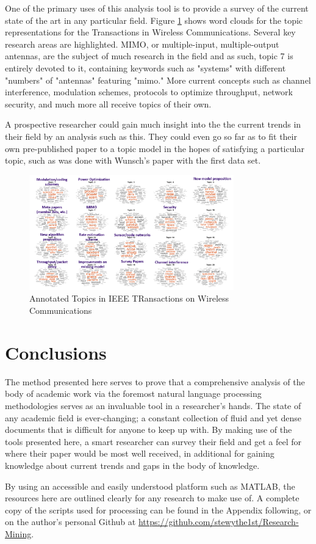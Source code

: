 \documentclass[conference]{IEEEtran}
\begin{document}
One of the primary uses of this analysis tool is to provide a survey of the current state of the art in any particular field. Figure \ref{fig:wirelesscomm_topics} shows word clouds for the topic representations for the Transactions in Wireless Communications. Several key research areas are highlighted. MIMO, or multiple-input, multiple-output antennas, are the subject of much research in the field and as such, topic 7 is entirely devoted to it, containing keywords such as "systems" with different "numbers" of "antennas" featuring "mimo." More current concepts such as channel interference, modulation schemes, protocols to optimize throughput, network security, and much more all receive topics of their own.

A prospective researcher could gain much insight into the the current trends in their field by an analysis such as this. They could even go so far as to fit their own pre-published paper to a topic model in the hopes of satisfying a particular topic, such as was done with Wunsch's paper with the first data set.

\begin{figure}
	\centering
	\includegraphics[width=3.49in]{wirelesscomm_topics.png}
	\caption{Annotated Topics in IEEE TRansactions on Wireless Communications}
	\label{fig:wirelesscomm_topics}
\end{figure}

\section{Conclusions}

The method presented here serves to prove that a comprehensive analysis of the body of academic work via the foremost natural language processing methodologies serves as an invaluable tool in a researcher's hands. The state of any academic field is ever-changing; a constant collection of fluid and yet dense documents that is difficult for anyone to keep up with. By making use of the tools presented here, a smart researcher can survey their field and get a feel for where their paper would be most well received, in additional for gaining knowledge about current trends and gaps in the body of knowledge.

By using an accessible and easily understood platform such as MATLAB, the resources here are outlined clearly for any research to make use of. A complete copy of the scripts used for processing can be found in the Appendix following, or on the author's personal Github at \url{https://github.com/stewythe1st/Research-Mining}.



\end{document}
